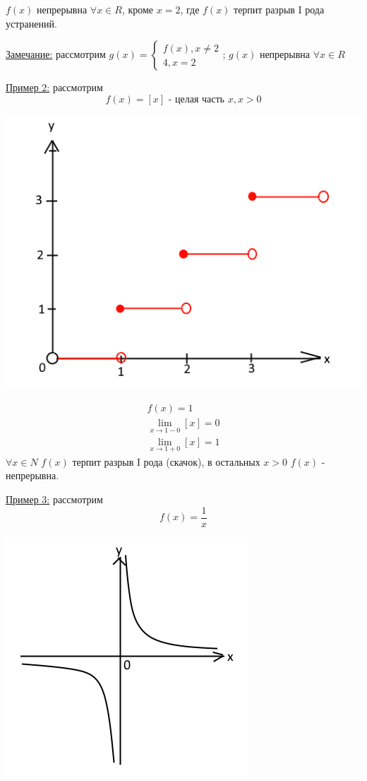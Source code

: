 \documentclass[12pt]{article}
\begin{document}
    $f(x)$ непрерывна $\forall x \in R$, кроме $x=2$, где $f(x)$ терпит разрыв I рода устранений.\par\noindent
    \underline{Замечание:} рассмотрим 
    $ g(x) = \begin{cases}
        f(x), x \ne 2\\
        4, x = 2
    \end{cases}$;
    \noindent $g(x)$ непрерывна $\forall x \in R$\par\noindent
    \underline{Пример 2:} рассмотрим
    \[
        f(x) = [x] \text{ - целая часть }x, x > 0
    \]
    \begin{center}
        \includegraphics{3.4.3}
    \end{center}
    \begin{gather*}
        f(x) = 1\\
        \lim_{x\to 1-0} [x] = 0\\
        \lim_{x \to 1+0} [x] = 1
    \end{gather*}
    $\forall x \in N$ $f(x)$ терпит разрыв I рода (скачок), в остальных $x > 0$ $f(x)$ - непрерывна.\par\noindent
    \underline{Пример 3:} рассмотрим
    \[ f(x) = \frac{1}{x} \]
    \begin{center}
        \includegraphics{3.4.4}
    \end{center}
\end{document}
